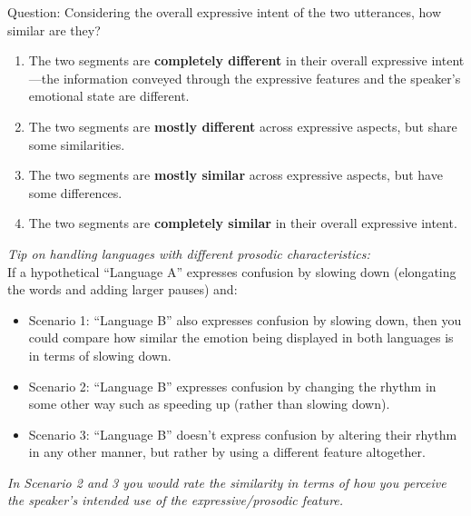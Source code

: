 Question: Considering the overall expressive intent of the two utterances, how similar are they?
\begin{enumerate}
    \item The two segments are \textbf{completely different} in their overall expressive intent—the information conveyed through the expressive features and the speaker's emotional state are different.
    \item The two segments are \textbf{mostly different} across expressive aspects, but share some similarities.
    \item The two segments are \textbf{mostly similar} across expressive aspects, but have some differences.
    \item The two segments are \textbf{completely similar} in their overall expressive intent.
\end{enumerate}

\begin{boxA}
    \textit{Tip on handling languages with different prosodic characteristics:}\\
    If a hypothetical “Language A” expresses confusion by slowing down (elongating the words and adding larger pauses) and:
    \begin{itemize}
        \item Scenario 1: “Language B” also expresses confusion by slowing down, then you could compare how similar the emotion being displayed in both languages is in terms of slowing down.
        \item Scenario 2:  “Language B” expresses confusion by changing the rhythm in some other way such as speeding up (rather than slowing down).
        \item Scenario 3: “Language B” doesn’t express confusion by altering their rhythm in any other manner, but rather by using a different feature altogether.
    \end{itemize}
\textit{In Scenario 2 and 3 you would rate the similarity in terms of how you perceive the speaker’s intended use of the expressive/prosodic feature.}
\end{boxA}

